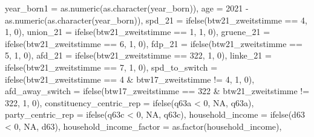 \documentclass[
]{article}
\newenvironment{Shaded}{\begin{snugshade}}{\end{snugshade}}
\newcommand{\AttributeTok}[1]{\textcolor[rgb]{0.77,0.63,0.00}{#1}}
\newcommand{\ConstantTok}[1]{\textcolor[rgb]{0.00,0.00,0.00}{#1}}
\newcommand{\DecValTok}[1]{\textcolor[rgb]{0.00,0.00,0.81}{#1}}
\newcommand{\FunctionTok}[1]{\textcolor[rgb]{0.00,0.00,0.00}{#1}}
\newcommand{\NormalTok}[1]{#1}
\newcommand{\SpecialCharTok}[1]{\textcolor[rgb]{0.00,0.00,0.00}{#1}}
\begin{document}
\begin{Shaded}
\begin{Highlighting}[]
         \AttributeTok{year\_born1 =} \FunctionTok{as.numeric}\NormalTok{(}\FunctionTok{as.character}\NormalTok{(year\_born)),}
         \AttributeTok{age =} \DecValTok{2021} \SpecialCharTok{{-}} \FunctionTok{as.numeric}\NormalTok{(}\FunctionTok{as.character}\NormalTok{(year\_born)),}
         \AttributeTok{spd\_21 =} \FunctionTok{ifelse}\NormalTok{(btw21\_zweitstimme }\SpecialCharTok{==} \DecValTok{4}\NormalTok{, }\DecValTok{1}\NormalTok{, }\DecValTok{0}\NormalTok{),}
         \AttributeTok{union\_21 =} \FunctionTok{ifelse}\NormalTok{(btw21\_zweitstimme }\SpecialCharTok{==} \DecValTok{1}\NormalTok{, }\DecValTok{1}\NormalTok{, }\DecValTok{0}\NormalTok{),}
         \AttributeTok{gruene\_21 =} \FunctionTok{ifelse}\NormalTok{(btw21\_zweitstimme }\SpecialCharTok{==} \DecValTok{6}\NormalTok{, }\DecValTok{1}\NormalTok{, }\DecValTok{0}\NormalTok{),}
         \AttributeTok{fdp\_21 =} \FunctionTok{ifelse}\NormalTok{(btw21\_zweitstimme }\SpecialCharTok{==} \DecValTok{5}\NormalTok{, }\DecValTok{1}\NormalTok{, }\DecValTok{0}\NormalTok{),}
         \AttributeTok{afd\_21 =} \FunctionTok{ifelse}\NormalTok{(btw21\_zweitstimme }\SpecialCharTok{==} \DecValTok{322}\NormalTok{, }\DecValTok{1}\NormalTok{, }\DecValTok{0}\NormalTok{),}
         \AttributeTok{linke\_21 =} \FunctionTok{ifelse}\NormalTok{(btw21\_zweitstimme }\SpecialCharTok{==} \DecValTok{7}\NormalTok{, }\DecValTok{1}\NormalTok{, }\DecValTok{0}\NormalTok{), }
         \AttributeTok{spd\_to\_switch =} \FunctionTok{ifelse}\NormalTok{(btw21\_zweitstimme }\SpecialCharTok{==} \DecValTok{4} \SpecialCharTok{\&}\NormalTok{ btw17\_zweitstimme }\SpecialCharTok{!=} \DecValTok{4}\NormalTok{, }\DecValTok{1}\NormalTok{, }\DecValTok{0}\NormalTok{),}
         \AttributeTok{afd\_away\_switch =} \FunctionTok{ifelse}\NormalTok{(btw17\_zweitstimme }\SpecialCharTok{==} \DecValTok{322} \SpecialCharTok{\&}\NormalTok{ btw21\_zweitstimme }\SpecialCharTok{!=} \DecValTok{322}\NormalTok{, }\DecValTok{1}\NormalTok{, }\DecValTok{0}\NormalTok{),}
         \AttributeTok{constituency\_centric\_rep =} \FunctionTok{ifelse}\NormalTok{(q63a }\SpecialCharTok{\textless{}} \DecValTok{0}\NormalTok{, }\ConstantTok{NA}\NormalTok{, q63a),}
         \AttributeTok{party\_centric\_rep =} \FunctionTok{ifelse}\NormalTok{(q63c }\SpecialCharTok{\textless{}} \DecValTok{0}\NormalTok{, }\ConstantTok{NA}\NormalTok{, q63c),}
         \AttributeTok{household\_income =} \FunctionTok{ifelse}\NormalTok{(d63 }\SpecialCharTok{\textless{}} \DecValTok{0}\NormalTok{, }\ConstantTok{NA}\NormalTok{, d63),}
         \AttributeTok{household\_income\_factor =} \FunctionTok{as.factor}\NormalTok{(household\_income),}

\end{Highlighting}
\end{Shaded}
\end{document}
